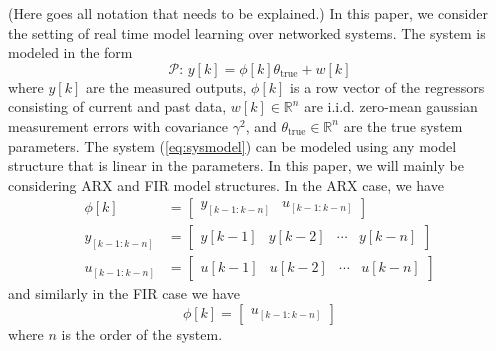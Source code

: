 
{\color{red}(Here goes all notation that needs to be explained.)}
In this paper, we consider the setting of real time model learning over
networked  systems. The system is modeled in the form
\begin{equation}
        \mathcal{P}:\, y[k] = \phi[k]\theta_{\text{true}} + w[k]
        \label{eq:sysmodel}
\end{equation}
where $y[k]$ are the measured outputs, $\phi[k]$ is a row vector of
the regressors consisting of current and past data, $w[k] \in \mathbb{R}^n$
are i.i.d. zero-mean gaussian measurement errors with covariance $\gamma^2$, and
$\theta_{\text{true}} \in \mathbb{R}^n$ are the true system parameters.
The system (\ref{eq:sysmodel}) can be modeled using any model structure that
is linear in the parameters. In this paper, we will mainly be considering
ARX and FIR model structures. In the ARX case, we have
\begin{equation}
        \begin{split}
                \phi[k] &= \begin{bmatrix}
                        y_{[k-1:k-n]} & u_{[k-1:k-n]}  
                \end{bmatrix} \\
                y_{[k-1:k-n]} &= \begin{bmatrix}
                        y[k-1] & y[k-2] & \cdots & y[k-n]
                \end{bmatrix} \\
                u_{[k-1:k-n]}  &= \begin{bmatrix}
                        u[k-1] & u[k-2] & \cdots & u[k-n]
                \end{bmatrix}
        \end{split}
\end{equation}
and similarly in the FIR case we have
\begin{equation}
        \phi[k] = \begin{bmatrix}
                u_{[k-1:k-n]}  
        \end{bmatrix}
\end{equation}
where $n$ is the order of the system. \cite{ljung_system_1999}

